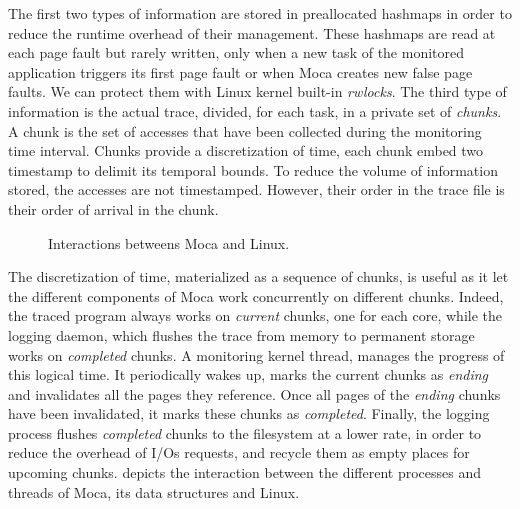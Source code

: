The first two types of information are stored in preallocated hashmaps in order to reduce the
runtime overhead of their management.  These hashmaps are read at each page fault but rarely
written, only when a new task of the monitored application triggers its first page
fault or when \gls{Moca} creates new false page faults. We can protect
them with Linux kernel built-in \emph{rwlocks}.
The third type of information is the actual
trace, divided, for each task, in a private set of \emph{chunks}. A chunk is the set of
accesses that have been collected during the monitoring time interval. Chunks provide a discretization
of time, each chunk embed two timestamp to delimit its temporal bounds.
To reduce the volume of information stored, the accesses are not timestamped. However, their order in the trace file is their
order of arrival in the chunk.

\begin{figure}[htb]
    \centering
    
    \caption{Interactions betweens Moca and Linux.}
    \label{fig:moca}
\end{figure}

The discretization of time, materialized as a sequence of chunks, is useful as it let the
different components of \gls{Moca} work concurrently on different chunks.  Indeed, the traced
program always works on \emph{current} chunks, one for each core, while the logging daemon,
which flushes the trace from memory to permanent storage works on \emph{completed} chunks. A
monitoring kernel thread, manages the progress of this logical time. It periodically wakes up, marks the current chunks as
\emph{ending} and invalidates all the pages they reference. Once all pages of the \emph{ending}
chunks have been invalidated, it marks these chunks as \emph{completed}. Finally, the
logging process flushes \emph{completed} chunks to the filesystem at a lower
rate, in order to reduce the overhead of I/Os requests,
and recycle them as empty places for upcoming chunks.   depicts the interaction between the
different processes and threads of \gls{Moca}, its data structures and Linux.

